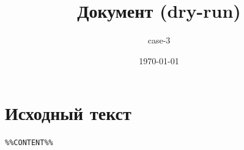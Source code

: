 \documentclass[a4paper,12pt]{article}
\title{Документ (dry-run)}
\author{case-3}
\date{\today}
\begin{document}
\maketitle

\section{Исходный текст}

\begin{verbatim}
%%CONTENT%%
\end{verbatim}
\end{document}
